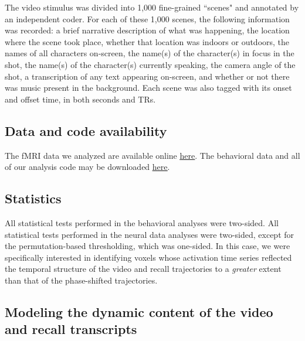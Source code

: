 \documentclass{article}
\begin{document}
The video stimulus was divided into 1,000 fine-grained ``scenes" and annotated by an independent coder.  For each of these 1,000 scenes, the following information was recorded: a brief narrative description of what was happening, the location where the scene took place, whether that location was indoors or outdoors, the names of all characters on-screen, the name(s) of the character(s) in focus in the shot, the name(s) of the character(s) currently speaking, the camera angle of the shot, a transcription of any text appearing on-screen, and whether or not there was music present in the background.  Each scene was also tagged with its onset and offset time, in both seconds and TRs.

\subsection*{Data and code availability}
The fMRI data we analyzed are available online \href{http://dataspace.princeton.edu/jspui/handle/88435/dsp01nz8062179}{\underline{here}}.  The behavioral data and all of our analysis code may be downloaded \href{https://github.com/ContextLab/sherlock-topic-model-paper}{\underline{here}}.

\subsection*{Statistics}
All statistical tests performed in the behavioral analyses were two-sided.  All statistical tests performed in the neural data analyses were two-sided, except for the permutation-based thresholding, which was one-sided.  In this case, we were specifically interested in identifying voxels whose activation time series reflected the temporal structure of the video and recall trajectories to a \textit{greater} extent than that of the phase-shifted trajectories.

\subsection*{Modeling the dynamic content of the video and recall transcripts}
\end{document}
